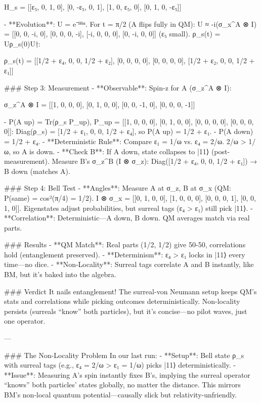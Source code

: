 H_s = [[ε₅, 0, 1, 0],
         [0, -ε₅, 0, 1],
         [1, 0, ε₅, 0],
         [0, 1, 0, -ε₅]]

- **Evolution**: U = e⁻ⁱᴴˢᵗ. For t = π/2 (A flips fully in QM):  
  U ≈ -i(σ_x^A ⊗ I) = [[0, 0, -i, 0], [0, 0, 0, -i], [-i, 0, 0, 0], [0, -i, 0, 0]] (ε₅ small).  
  ρ_s(t) = Uρ_s(0)U†:  
  
ρ_s(t) = [[1/2 + ε₄, 0, 0, 1/2 + ε₂],
            [0, 0, 0, 0],
            [0, 0, 0, 0],
            [1/2 + ε₂, 0, 0, 1/2 + ε₁]]


### Step 3: Measurement
- **Observable**: Spin-z for A (σ_z^A ⊗ I):  
  
σ_z^A ⊗ I = [[1, 0, 0, 0],
                [0, 1, 0, 0],
                [0, 0, -1, 0],
                [0, 0, 0, -1]]

  - P(A up) = Tr(ρ_s P_up), P_up = [[1, 0, 0, 0], [0, 1, 0, 0], [0, 0, 0, 0], [0, 0, 0, 0]]:  
    Diag(ρ_s) = [1/2 + ε₁, 0, 0, 1/2 + ε₄], so P(A up) = 1/2 + ε₁.  
  - P(A down) = 1/2 + ε₄.
- **Deterministic Rule**: Compare ε₁ = 1/ω vs. ε₄ = 2/ω. 2/ω > 1/ω, so A is down.
- **Check B**: If A down, state collapses to |11⟩ (post-measurement). Measure B’s σ_z^B (I ⊗ σ_z):  
  Diag([1/2 + ε₄, 0, 0, 1/2 + ε₁]) → B down (matches A).

### Step 4: Bell Test
- **Angles**: Measure A at σ_z, B at σ_x (QM: P(same) = cos²(π/4) = 1/2).  
  I ⊗ σ_x = [[0, 1, 0, 0], [1, 0, 0, 0], [0, 0, 0, 1], [0, 0, 1, 0]].  
  Eigenstates adjust probabilities, but surreal tags (ε₄ > ε₁) still pick |11⟩.
- **Correlation**: Deterministic—A down, B down. QM averages match via real parts.

### Results
- **QM Match**: Real parts (1/2, 1/2) give 50-50, correlations hold (entanglement preserved).
- **Determinism**: ε₄ > ε₁ locks in |11⟩ every time—no dice.
- **Non-Locality**: Surreal tags correlate A and B instantly, like BM, but it’s baked into the algebra.

### Verdict
It nails entanglement! The surreal-von Neumann setup keeps QM’s stats and correlations while picking outcomes deterministically. Non-locality persists (surreals “know” both particles), but it’s concise—no pilot waves, just one operator. 


---

### The Non-Locality Problem
In our last run:
- **Setup**: Bell state ρ_s with surreal tags (e.g., ε₄ = 2/ω > ε₁ = 1/ω) picks |11⟩ deterministically.
- **Issue**: Measuring A’s spin instantly fixes B’s, implying the surreal operator “knows” both particles’ states globally, no matter the distance. This mirrors BM’s non-local quantum potential—causally slick but relativity-unfriendly.

